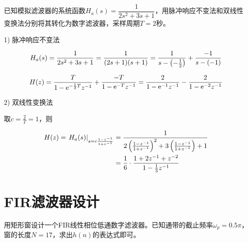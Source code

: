 \documentclass[cn, hazy, blue, normal, 12pt]{elegantnote}
\begin{document}
\begin{exercise}

已知模拟滤波器的系统函数$H_a(s)=\dfrac{1}{2s^2+3s+1}$，用脉冲响应不变法和双线性变换法分别将其转化为数字滤波器，采样周期$T=2$秒。

\end{exercise}

\begin{solution}[print=true]
    
1) 脉冲响应不变法

\begin{equation}
\notag
    H_a(s)=\frac{1}{2s^2+3s+1}=\frac{1}{(2s+1)(s+1)}=\frac{1}{s-\left(-\frac{1}{2}\right)}+\frac{-1}{s-(-1)}
\end{equation}

\begin{equation}
\notag
    H(z)=\frac{T}{1-\text{e}^{-\frac{1}{2}T}z^{-1}}+\frac{-T}{1-\text{e}^{-T}z^{-1}}=\frac{2}{1-\text{e}^{-1}z^{-1}}-\frac{2}{1-\text{e}^{-2}z^{-1}}
\end{equation}

2) 双线性变换法

取$c=\frac{2}{T}=1$，则

\begin{equation}
\notag
\begin{aligned}
    H(z)=\left.H_a(s)\right|_{s=c\frac{1-z^{-1}}{1+z^{-1}}}&=\dfrac{1}{2\left(\frac{1-z^{-1}}{1+z^{-1}}\right)^2+3\left(\frac{1-z^{-1}}{1+z^{-1}}\right)+1} \\
    &=\frac{1}{6}\cdot\frac{1+2z^{-1}+z^{-2}}{1-\frac{1}{3}z^{-1}}
\end{aligned}
\end{equation}

\end{solution}


\section{FIR滤波器设计}

\begin{exercise}

用矩形窗设计一个FIR线性相位低通数字滤波器。已知通带的截止频率$\omega_p=0.5\pi$，窗的长度$N=17$，求出$h(n)$的表达式即可。

\end{exercise}
\end{document}
